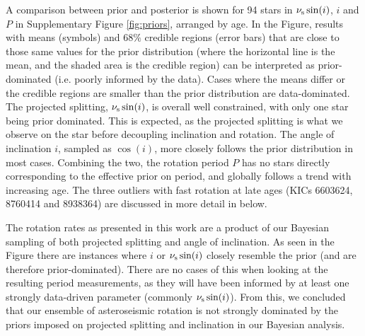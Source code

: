 A comparison between prior and posterior is shown for 94 stars in $\nu_{\rm s}\sin(i)$, $i$ and $P$ in Supplementary Figure \ref{fig:priors}, arranged by age. In the Figure, results with means (symbols) and $68\%$ credible regions (error bars) that are close to those same values for the prior distribution (where the horizontal line is the mean, and the shaded area is the credible region) can be interpreted as prior-dominated (i.e. poorly informed by the data). Cases where the means differ or the credible regions are smaller than the prior distribution are data-dominated. The projected splitting, $\nu_{\rm s}\sin(i)$, is overall well constrained, with only one star being prior dominated. This is expected, as the projected splitting is what we observe on the star before decoupling inclination and rotation. The angle of inclination $i$, sampled as $\cos(i)$, more closely follows the prior distribution in most cases. Combining the two, the rotation period $P$ has no stars directly corresponding to the effective prior on period, and globally follows a trend with increasing age. The three outliers with fast rotation at late ages (KICs 6603624, 8760414 and 8938364) are discussed in more detail in below.

The rotation rates as presented in this work are a product of our Bayesian sampling of both projected splitting and angle of inclination. As seen in the Figure there are instances where $i$ or $\nu_{\rm s}\sin(i)$ closely resemble the prior (and are therefore prior-dominated). There are no cases of this when looking at the resulting period measurements, as they will have been informed by at least one strongly data-driven parameter (commonly $\nu_{\rm s}\sin(i)$). From this, we concluded that our ensemble of asteroseismic rotation is not strongly dominated by the priors imposed on projected splitting and inclination in our Bayesian analysis.

